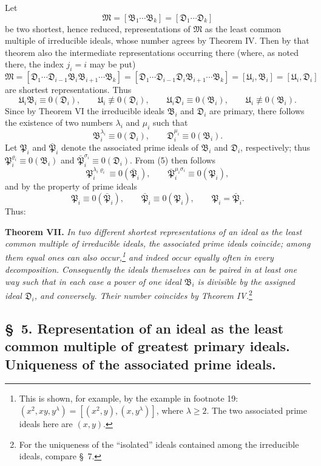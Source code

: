 \documentclass[11pt]{article}
\newcommand{\ideal}[1]{\mathfrak{#1}}
\begin{document}
Let
\[
 \ideal M=[\ideal B_1\cdots\ideal B_k]=[\ideal D_1\cdots\ideal D_k]
\]
be two shortest, hence reduced, representations of $\ideal M$ as the least common multiple of irreducible ideals, whose number agrees by Theorem IV. Then by that theorem also the intermediate representations occurring there (where, as noted there, the index $j_i=i$ may be put)
\[
 \ideal M=[\ideal D_1\cdots\ideal D_{i-1}\ideal B_i\ideal B_{i+1}\cdots\ideal B_k]
       =[\ideal D_1\cdots\ideal D_{i-1}\ideal D_i\ideal B_{i+1}\cdots\ideal B_k]
       =[\ideal U_i,\ideal B_i]=[\ideal U_i,\ideal D_i]
\]
are shortest representations. Thus
\[
 \ideal U_i\ideal B_i\equiv0(\ideal D_i),\qquad \ideal U_i\not\equiv0(\ideal D_i),
 \qquad
 \ideal U_i\ideal D_i\equiv0(\ideal B_i),\qquad \ideal U_i\not\equiv0(\ideal B_i).
\]
Since by Theorem VI the irreducible ideals $\ideal B_i$ and $\ideal D_i$ are primary, there follows the existence of two numbers $\lambda_i$ and $\mu_i$ such that
\begin{equation}
 \ideal B_i^{\lambda_i}\equiv0(\ideal D_i),
 \qquad
 \ideal D_i^{\mu_i}\equiv0(\ideal B_i).
\tag{5}
\end{equation}
Let $\ideal P_i$ and $\bar{\ideal P}_i$ denote the associated prime ideals of $\ideal B_i$ and $\ideal D_i$, respectively; thus $\ideal P_i^{\varrho_i}\equiv0(\ideal B_i)$ and $\bar{\ideal P}_i^{\sigma_i}\equiv0(\ideal D_i)$. From (5) then follows
\[
 \ideal P_i^{\lambda_i\varrho_i}\equiv0(\bar{\ideal P}_i),
 \qquad
 \bar{\ideal P}_i^{\mu_i\sigma_i}\equiv0(\ideal P_i),
\]
and by the property of prime ideals
\[
 \ideal P_i\equiv0(\bar{\ideal P}_i),
 \qquad
 \bar{\ideal P}_i\equiv0(\ideal P_i),
 \qquad
 \ideal P_i=\bar{\ideal P}_i.
\]
Thus:

\textbf{Theorem VII.} \emph{In two different shortest representations of an ideal as the least common multiple of irreducible ideals, the associated prime ideals coincide; among them equal ones can also occur,\footnote{This is shown, for example, by the example in footnote 19: $(x^2,xy,y^\lambda)=[(x^2,y),(x,y^\lambda)]$, where $\lambda\ge2$. The two associated prime ideals here are $(x,y)$.} and indeed occur equally often in every decomposition. Consequently the ideals themselves can be paired in at least one way such that in each case a power of one ideal $\ideal B_i$ is divisible by the assigned ideal $\ideal D_i$, and conversely. Their number coincides by Theorem IV.}\footnote{For the uniqueness of the ``isolated'' ideals contained among the irreducible ideals, compare \S~7.}

\subsection*{\S~5. Representation of an ideal as the least common multiple of greatest primary ideals. Uniqueness of the associated prime ideals.}
\end{document}
